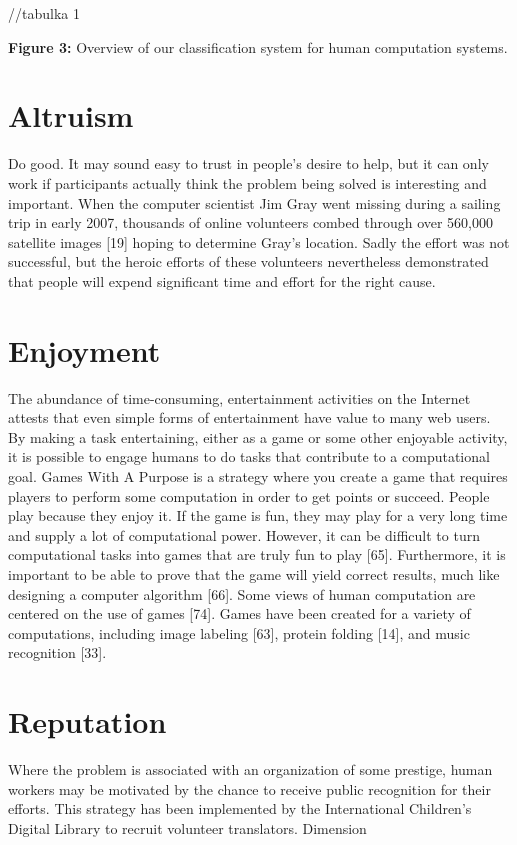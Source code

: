\documentclass{acm_proc_article-sp} %
\begin{document}
//tabulka 1

\textbf{Figure 3:} Overview of our classification system for human computation systems. 

\section{Altruism} Do good. It may sound easy to trust in people's desire to help, but it can only work if participants actually think the problem being solved is interesting and important.  When the computer scientist Jim Gray went missing during a sailing trip in early 2007, thousands of online volunteers combed through over 560,000 satellite images [19] hoping to determine Gray’s location. Sadly the effort was not successful, but the heroic efforts of these volunteers nevertheless demonstrated that people will expend significant time and effort for the right cause. 

\section{Enjoyment} The abundance of time-consuming, entertainment activities on the Internet attests that even simple forms of entertainment have value to many web users. By making a task entertaining, either as a game or some other enjoyable activity, it is possible to engage humans to do tasks that contribute to a computational goal. Games With A Purpose is a strategy where you create a game that requires players to perform some computation in order to get points or succeed. People play because they enjoy it. If the game is fun, they may play for a very long time and supply a lot of computational power. However, it can be difficult to turn computational tasks into games that are truly fun to play [65]. Furthermore, it is important to be able to prove that the game will yield correct results, much like designing a computer algorithm [66]. Some views of human computation are centered on the use of games [74]. Games have been created for a variety of computations, including image labeling [63], protein folding [14], and music recognition [33].

\section{Reputation} Where the problem is associated with an organization of some prestige, human workers may be motivated by the chance to receive public recognition for their efforts. This strategy has been implemented by the International Children's Digital Library to recruit volunteer translators. 
Dimension 
\end{document}
